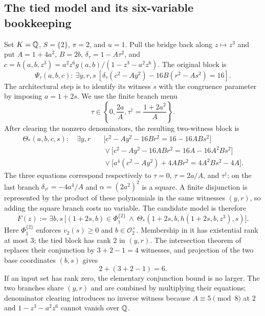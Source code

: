 \subsection{The tied model and its six-variable bookkeeping}

Set $K=\mathbb{Q}$, $S=\{2\}$, $\pi=2$, and $u=1$.  Pull the bridge back along
$z\mapsto z^3$ and put
$A=1+4a^2$, $B=2b$, $\delta_\tau=1-A\tau^2$, and
$c=h(a,b,z^3)=a^2z^6g(a,b)/(1-z^3-a^2z^6)$.
The original block is
\[
\Psi_\tau(a,b,c):\ \exists y,r,s\ [\delta_\tau(c^2 - Ay^2) - 16B(r^2 - As^2) = 16].
\]
The architectural step is to identify its witness $s$ with the congruence
parameter by imposing $a=1+2s$.  We use the finite branch menu
\[
 \tau\in\left\{0,\frac{2a}{A},
 \tau^\dagger=\frac{1+2a^2}{A}\right\}.
\]
After clearing the nonzero denominators, the resulting two-witness block is
\[
\begin{aligned}
\Theta_*(a,b,c,s):\quad \exists y,r\quad&
\bigl[c^2-Ay^2-16Br^2=16-16ABs^2\bigr]\\
&{}\vee
\bigl[c^2-Ay^2-16ABr^2=16A-16A^2Bs^2\bigr]\\
&{}\vee
\bigl[a^4(c^2-Ay^2)+4ABr^2=4A^2Bs^2-4A\bigr].
\end{aligned}
\]
The three equations correspond respectively to
$\tau=0$, $\tau=2a/A$, and $\tau^\dagger$; on the last branch
$\delta_{\tau^\dagger}=-4a^4/A$ and
$\alpha=(2a^2)^2$ is a square.  A finite disjunction is represented by the
product of these polynomials in the same witnesses $(y,r)$, so adding the
square branch costs no variable.
The candidate model is therefore
\[
F(z):=\exists b,s\ \bigl[(1+2s,b)\in\Phi_1^{\{2\}}\ \wedge\
\Theta_*(1+2s,b,h(1+2s,b,z^3),s)\bigr].
\]
Here $\Phi_1^{\{2\}}$ enforces $v_2(s)\geq0$ and
$b\in\mathcal O_2^\times$.  Membership in it has existential rank at most
$3$; the tied block has rank $2$ in $(y,r)$.
The intersection theorem of \cite{ddf} replaces their conjunction by
$3+2-1=4$ witnesses, and projection of the two base coordinates $(b,s)$
gives
\[
 2+(3+2-1)=6.
\]
If an input set has rank zero, the elementary conjunction bound is no
larger.  The two branches share $(y,r)$ and are combined by multiplying
their equations; denominator clearing introduces no inverse witness because
$A\equiv5\pmod8$ at $2$ and $1-z^3-a^2z^6$ cannot vanish over $\mathbb{Q}$.

